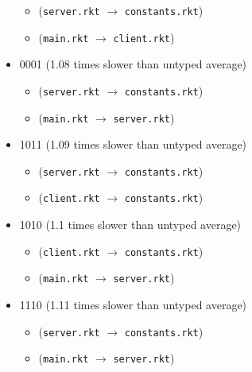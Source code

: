 \documentclass{article}
\newcommand{\mono}[1]{\texttt{#1}}
\begin{document}
\begin{itemize}
  \begin{itemize}
  \item (\mono{server.rkt} $\rightarrow$ \mono{constants.rkt})
  \item (\mono{main.rkt} $\rightarrow$ \mono{client.rkt})
  \end{itemize}
\item 0001 (1.08 times slower than untyped average)
  \begin{itemize}
  \item (\mono{server.rkt} $\rightarrow$ \mono{constants.rkt})
  \item (\mono{main.rkt} $\rightarrow$ \mono{server.rkt})
  \end{itemize}
\item 1011 (1.09 times slower than untyped average)
  \begin{itemize}
  \item (\mono{server.rkt} $\rightarrow$ \mono{constants.rkt})
  \item (\mono{client.rkt} $\rightarrow$ \mono{constants.rkt})
  \end{itemize}
\item 1010 (1.1 times slower than untyped average)
  \begin{itemize}
  \item (\mono{client.rkt} $\rightarrow$ \mono{constants.rkt})
  \item (\mono{main.rkt} $\rightarrow$ \mono{server.rkt})
  \end{itemize}
\item 1110 (1.11 times slower than untyped average)
  \begin{itemize}
  \item (\mono{server.rkt} $\rightarrow$ \mono{constants.rkt})
  \item (\mono{main.rkt} $\rightarrow$ \mono{server.rkt})
  \end{itemize}


\end{itemize}
\end{document}
